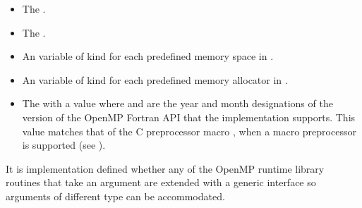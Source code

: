 \begin{fortranspecific}
\begin{itemize}
\item The   .

\item The   .

\item An   variable of kind  for each predefined memory space in .

\item An   variable of kind  for each predefined memory allocator in .

\item The    with a value  where 
and  are the year and month designations of the version of the OpenMP Fortran
API that the implementation supports. This value matches that of the C preprocessor
macro , when a macro preprocessor is supported (see
).
\end{itemize}


It is implementation defined whether any of the OpenMP runtime library routines that
take an argument are extended with a generic interface so arguments of different 
type can be accommodated. 
\end{fortranspecific}








